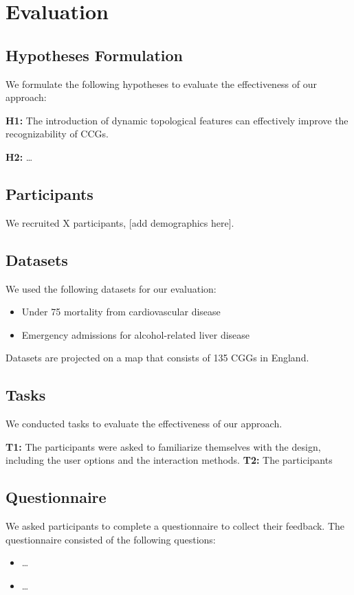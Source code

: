 \color{blue}

\section{Evaluation}

\subsection{Hypotheses Formulation}

We formulate the following hypotheses to evaluate the effectiveness of our approach:

\textbf{H1:} The introduction of dynamic topological features can effectively improve the recognizability of CCGs.

\textbf{H2:} \dots

\subsection{Participants}

We recruited X participants, [add demographics here].

\subsection{Datasets}

We used the following datasets for our evaluation:

\begin{itemize}
    \item Under 75 mortality from cardiovascular disease
    \item Emergency admissions for alcohol-related liver disease
\end{itemize}

Datasets are projected on a map that consists of 135 CGGs in England.

\subsection{Tasks}

We conducted tasks to evaluate the effectiveness of our approach.

\textbf{T1:} The participants were asked to familiarize themselves with the design, including the user options and the interaction methods.
\textbf{T2:} The participants 


\subsection{Questionnaire}

We asked participants to complete a questionnaire to collect their feedback. The questionnaire consisted of the following questions:

\begin{itemize}
    \item \dots
    \item \dots
\end{itemize}

\color{black}